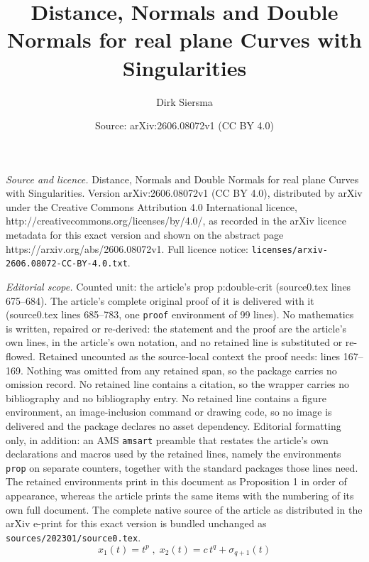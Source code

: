 \documentclass[10pt,a4paper]{amsart}
\title{Distance, Normals and Double Normals for real plane Curves with Singularities}
\author{Dirk Siersma}
\date{Source: arXiv:2606.08072v1 (CC BY 4.0)}
\begin{document}
\maketitle

\noindent\emph{Source and licence.} Distance, Normals and Double Normals for real plane Curves with Singularities. Version arXiv:2606.08072v1 (CC BY 4.0), distributed by arXiv under the Creative Commons Attribution 4.0 International licence, http://creativecommons.org/licenses/by/4.0/, as recorded in the arXiv licence metadata for this exact version and shown on the abstract page https://arxiv.org/abs/2606.08072v1. Full licence notice: \texttt{licenses/arxiv-2606.08072-CC-BY-4.0.txt}.\par\smallskip

\noindent\textit{Editorial scope.} Counted unit: the article's prop p:double-crit (source0.tex lines 675--684). The article's complete original proof of it is delivered with it (source0.tex lines 685--783, one \texttt{proof} environment of 99 lines). No mathematics is written, repaired or re-derived: the statement and the proof are the article's own lines, in the article's own notation, and no retained line is substituted or re-flowed.  Retained uncounted as the source-local context the proof needs: lines 167--169.  Nothing was omitted from any retained span, so the package carries no omission record.  No retained line contains a citation, so the wrapper carries no bibliography and no bibliography entry.  No retained line contains a figure environment, an image-inclusion command or drawing code, so no image is delivered and the package declares no asset dependency.  Editorial formatting only, in addition: an AMS \texttt{amsart} preamble that restates the article's own declarations and macros used by the retained lines, namely the environments \texttt{prop} on separate counters, together with the standard packages those lines need.  The retained environments print in this document as Proposition 1 in order of appearance, whereas the article prints the same items with the numbering of its own full document.  The complete native source of the article as distributed in the arXiv e-print for this exact version is bundled unchanged as \texttt{sources/202301/source0.tex}.
\begin{equation}\label{e:Puis}
x_1(t) = t ^p \; , \;  x_2(t) = c \,t^q + \sigma_{q+1}(t) 
\end{equation}
\end{document}
